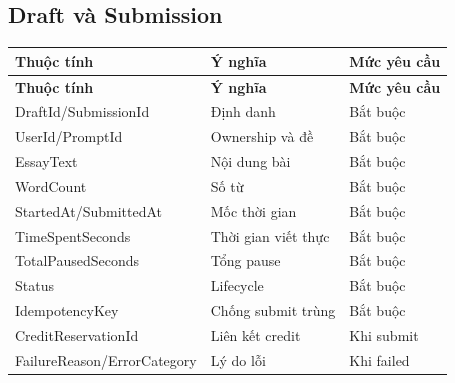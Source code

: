 \documentclass[11pt,a4paper]{article}
\begin{document}
\subsection{Draft và Submission}
\small
\setlength{\tabcolsep}{4pt}
\renewcommand{\arraystretch}{1.18}
\begin{longtable}{|P{0.28\textwidth}|P{0.45\textwidth}|P{0.19\textwidth}|}
\hline
\textbf{Thuộc tính} & \textbf{Ý nghĩa} & \textbf{Mức yêu cầu} \\ \hline
\endfirsthead
\hline
\textbf{Thuộc tính} & \textbf{Ý nghĩa} & \textbf{Mức yêu cầu} \\ \hline
\endhead
DraftId/\allowbreak{}SubmissionId & Định danh & Bắt buộc \\ \hline
UserId/\allowbreak{}PromptId & Ownership và đề & Bắt buộc \\ \hline
EssayText & Nội dung bài & Bắt buộc \\ \hline
WordCount & Số từ & Bắt buộc \\ \hline
StartedAt/\allowbreak{}SubmittedAt & Mốc thời gian & Bắt buộc \\ \hline
TimeSpentSeconds & Thời gian viết thực & Bắt buộc \\ \hline
TotalPausedSeconds & Tổng pause & Bắt buộc \\ \hline
Status & Lifecycle & Bắt buộc \\ \hline
IdempotencyKey & Chống submit trùng & Bắt buộc \\ \hline
CreditReservationId & Liên kết credit & Khi submit \\ \hline
FailureReason/\allowbreak{}ErrorCategory & Lý do lỗi & Khi failed \\ \hline
\end{longtable}
\normalsize
\end{document}
